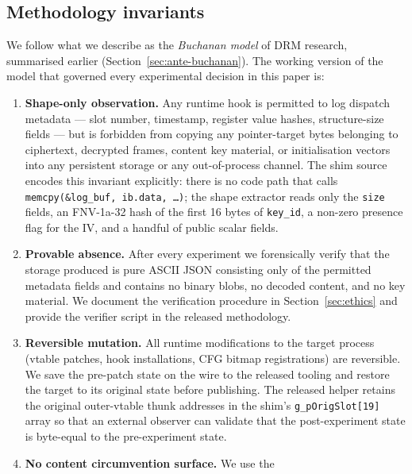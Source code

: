 \documentclass[11pt,letterpaper]{article}
\begin{document}
\subsection{Methodology invariants}
\label{sec:threat-invariants}

We follow what we describe as the \emph{Buchanan model} of DRM
research, summarised earlier (Section~\ref{sec:ante-buchanan}). The
working version of the model that governed every experimental
decision in this paper is:

\begin{enumerate}[itemsep=2pt,topsep=2pt]
  \item \textbf{Shape-only observation.} Any runtime hook is
        permitted to log dispatch metadata --- slot number,
        timestamp, register value hashes, structure-size fields ---
        but is forbidden from copying any pointer-target bytes
        belonging to ciphertext, decrypted frames, content key
        material, or initialisation vectors into any persistent
        storage or any out-of-process channel. The shim source
        encodes this invariant explicitly: there is no code path
        that calls \texttt{memcpy(\&log\_buf, ib.data, \dots)};
        the shape extractor reads only the \texttt{size} fields,
        an FNV-1a-32 hash of the first 16 bytes of \texttt{key\_id},
        a non-zero presence flag for the IV, and a handful of public
        scalar fields.
  \item \textbf{Provable absence.} After every experiment we
        forensically verify that the storage produced is pure ASCII
        JSON consisting only of the permitted metadata fields and
        contains no binary blobs, no decoded content, and no key
        material. We document the verification procedure in
        Section~\ref{sec:ethics} and provide the verifier script
        in the released methodology.
  \item \textbf{Reversible mutation.} All runtime modifications to
        the target process (vtable patches, hook installations, CFG
        bitmap registrations) are reversible. We save the
        pre-patch state on the wire to the released tooling and
        restore the target to its original state before publishing.
        The released helper retains the original outer-vtable
        thunk addresses in the shim's
        \texttt{g\_pOrigSlot[19]} array so that an external observer
        can validate that the post-experiment state is byte-equal
        to the pre-experiment state.
  \item \textbf{No content circumvention surface.} We use the

\end{enumerate}
\end{document}
